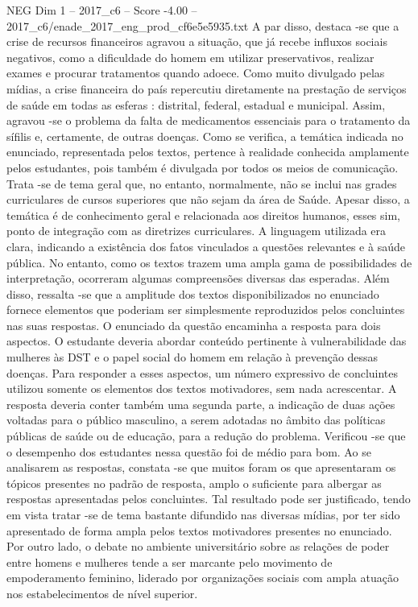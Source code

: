 \begin{textsample}{NEG Dim 1 – 2017\_c6 – Score -4.00 – 2017\_c6/enade\_2017\_eng\_prod\_cf6e5e5935.txt}
A par disso, destaca -se que a crise de recursos financeiros agravou a situação, que já recebe influxos sociais negativos, como a dificuldade do homem em utilizar preservativos, realizar exames e procurar tratamentos quando adoece.
Como muito divulgado pelas mídias, a crise financeira do país repercutiu diretamente na prestação de serviços de saúde em todas as esferas : distrital, federal, estadual e municipal.
Assim, agravou -se o problema da falta de medicamentos essenciais para o tratamento da sífilis e, certamente, de outras doenças.
Como se verifica, a temática indicada no enunciado, representada pelos textos, pertence à realidade conhecida amplamente pelos estudantes, pois também é divulgada por todos os meios de comunicação.
Trata -se de tema geral que, no entanto, normalmente, não se inclui nas grades curriculares de cursos superiores que não sejam da área de Saúde.
Apesar disso, a temática é de conhecimento geral e relacionada aos direitos humanos, esses sim, ponto de integração com as diretrizes curriculares.
A linguagem utilizada era clara, indicando a existência dos fatos vinculados a questões relevantes e à saúde pública.
No entanto, como os textos trazem uma ampla gama de possibilidades de interpretação, ocorreram algumas compreensões diversas das esperadas.
Além disso, ressalta -se que a amplitude dos textos disponibilizados no enunciado fornece elementos que poderiam ser simplesmente reproduzidos pelos concluintes nas suas respostas.
O enunciado da questão encaminha a resposta para dois aspectos.
O estudante deveria abordar conteúdo pertinente à vulnerabilidade das mulheres às DST e o papel social do homem em relação à prevenção dessas doenças.
Para responder a esses aspectos, um número expressivo de concluintes utilizou somente os elementos dos textos motivadores, sem nada acrescentar.
A resposta deveria conter também uma segunda parte, a indicação de duas ações voltadas para o público masculino, a serem adotadas no âmbito das políticas públicas de saúde ou de educação, para a redução do problema.
Verificou -se que o desempenho dos estudantes nessa questão foi de médio para bom.
Ao se analisarem as respostas, constata -se que muitos foram os que apresentaram os tópicos presentes no padrão de resposta, amplo o suficiente para albergar as respostas apresentadas pelos concluintes.
Tal resultado pode ser justificado, tendo em vista tratar -se de tema bastante difundido nas diversas mídias, por ter sido apresentado de forma ampla pelos textos motivadores presentes no enunciado.
Por outro lado, o debate no ambiente universitário sobre as relações de poder entre homens e mulheres tende a ser marcante pelo movimento de empoderamento feminino, liderado por organizações sociais com ampla atuação nos estabelecimentos de nível superior.

\end{textsample}
